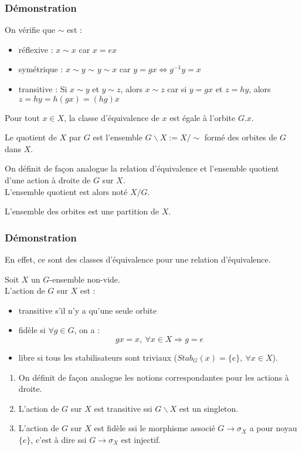 \documentclass[a4paper, oneside]{report}
\theoremstyle{break}
\newcommand{\dem}{\subsubsection{Démonstration}}
\begin{document}
\dem
On vérifie que $\sim$ est :
\begin{itemize}
\item réflexive : $x\sim x$ car $x=ex$
\item symétrique : $x\sim y$ $\sim$ $y\sim x$ car $y=gx\Leftrightarrow g^{-1}y=x$
\item transitive : Si $x\sim y$ et $y\sim z$, alors $x\sim z$ car si $y=gx$ et $z=hy$, alors $z=hy=h(gx)=(hg)x$
\end{itemize}

\remar
Pour tout $x\in X$, la classe d'équivalence de $x$ est égale à l'orbite $G.x$.

Le quotient de $X$ par $G$ est l'ensemble $G\backslash X := X/\sim$ formé des orbites de $G$ dans $X$.

\remar
On définit de façon analogue la relation d'équivalence et l'ensemble quotient d'une action à droite de $G$ sur $X$.\\
L'ensemble quotient est alors noté $X/G$.

\propr
L'ensemble des orbites est une partition de $X$.

\dem
En effet, ce sont des classes d'équivalence pour une relation d'équivalence.

Soit $X$ un $G$-ensemble non-vide.\\
L'action de $G$ sur $X$ est :
\begin{itemize}
\item transitive s'il n'y a qu'une seule orbite
\item fidèle si $\forall g\in G$, on a :
$$gx=x,~\forall x\in X \Rightarrow g=e$$
\item libre si tous les stabilisateurs sont triviaux ($Stab_G(x)=\{e\},~\forall x\in X$).
\end{itemize}

\remar
\begin{enumerate}
\item On définit de façon analogue les notions correspondantes pour les actions à droite.
\item L'action de $G$ sur $X$ est transitive ssi $G\backslash X$ est un singleton.
\item L'action de $G$ sur $X$ est fidèle ssi le morphisme associé $G\rightarrow \sigma_X$ a pour noyau $\{e\}$, c'est à dire ssi $G\rightarrow \sigma_X$ est injectif.
\end{enumerate}
\end{document}
